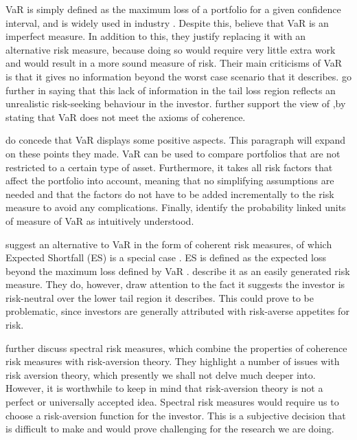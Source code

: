 \documentclass[12pt,a4paper]{article}
\begin{document}
VaR is simply defined as the maximum loss of a portfolio for a given confidence interval, and is widely used in industry \citep{consiglirisk}.  Despite this, \cite{dowd2006after} believe that VaR is an imperfect measure. In addition to this, they justify replacing it with an alternative risk measure, because doing so would require very little extra work and would result in a more sound measure of risk. Their main criticisms of VaR is that it gives no information beyond the worst case scenario that it describes. \cite{dowd2006after} go further in saying that this lack of information in the tail loss region reflects an unrealistic risk-seeking behaviour in the investor. \cite{ACERBI20021505} further support the view of \cite{dowd2006after},by stating that VaR does not meet the axioms of coherence.

\cite{dowd2006after} do concede that VaR displays some positive aspects. This paragraph will expand on these points they made. VaR can be used to compare portfolios that are not restricted to a certain type of asset. Furthermore, it takes all risk factors that affect the portfolio into account, meaning that no simplifying assumptions are needed and that the factors do not have to be added incrementally to the risk measure to avoid any complications. Finally, \cite{dowd2006after} identify the probability linked units of measure of VaR as intuitively understood.

\cite{dowd2006after} suggest an alternative to VaR in the form of coherent risk measures, of which Expected Shortfall (ES) is a special case \citep{ACERBI20021505}. ES is defined as the expected loss beyond the maximum loss defined by VaR \citep{consiglirisk}. \cite{dowd2006after} describe it as an easily generated risk measure. They do, however, draw attention to the fact it suggests the investor is risk-neutral over the lower tail region it describes. This could prove to be problematic, since investors are generally attributed with risk-averse appetites for risk.

\cite{dowd2006after} further discuss spectral risk measures, which combine the properties of coherence risk measures with risk-aversion theory. They highlight a number of issues with risk aversion theory, which presently we shall not delve much deeper into. However, it is worthwhile to keep in mind that risk-aversion theory is not a perfect or universally accepted idea. Spectral risk measures would require us to choose a risk-aversion function for the investor. This is a subjective decision that is difficult to make and would prove challenging for the research we are doing.
\end{document}
